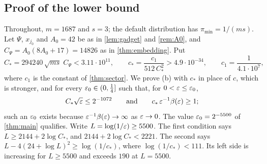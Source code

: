 \subsection{Proof of the lower bound}

Throughout, $m=1687$ and $s=3$; the default distribution has $\pi_{\min}=1/(ms)$. Let $\Psi$, $x_{j_0}$ and $A_0=42$ be as in
\cref{lem:gadget} and \cref{rem:A0}, and $C_\Psi=A_0(8A_0+17)=14826$ as in \cref{thm:embedding}. Put
\[
C_*=294240\,\sqrt{ms}\;C_\Psi<3.11\cdot10^{11},\qquad c_*=\frac{c_1}{512\,C_*^2}>4.9\cdot10^{-34},\qquad c_1=\frac1{4.1\cdot10^7},
\]
where $c_1$ is the constant of \cref{thm:sector}. We prove (b) with $c_*$ in place of $c$, which is stronger, and for every
$\varepsilon_0\in(0,\frac14]$ such that, for $0<\varepsilon\le\varepsilon_0$,
\begin{equation}\label{game:eps0}
C_*\sqrt{\varepsilon}\le2^{-1072}\qquad\text{and}\qquad c_*\,\varepsilon^{-1}\beta(\varepsilon)\ge1 ;
\end{equation}
such an $\varepsilon_0$ exists because $\varepsilon^{-1}\beta(\varepsilon)\to\infty$ as $\varepsilon\to0$. The value $\varepsilon_0=2^{-5500}$ of \cref{thm:main} qualifies.
Write $L=\log(1/\varepsilon)\ge5500$. The first condition says $L\ge2144+2\log C_*$, and $2144+2\log C_*<2221$. The second says
$L-4(24+\log L)^2\ge\log(1/c_*)$, where $\log(1/c_*)<111$. Its left side is increasing for $L\ge5500$ and exceeds $190$ at $L=5500$.

